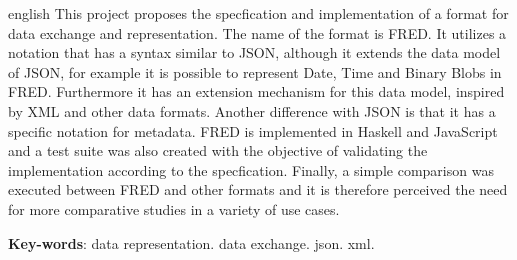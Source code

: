 \begin{resumo}[Abstract]
 \begin{otherlanguage*}{english}
   This project proposes the specfication and implementation of a format
   for data exchange and representation. The name of the format is FRED.
   It utilizes a notation that has a syntax similar to JSON, although
   it extends the data model of JSON, for example it is possible to represent
   Date, Time and Binary Blobs in FRED. Furthermore it has an extension 
   mechanism for this data model, inspired by XML and other data formats.
   Another difference with JSON is that it has a specific notation for
   metadata. FRED is implemented in Haskell and JavaScript and a test suite
   was also created with the objective of validating the implementation
   according to the specfication. Finally, a simple comparison was executed
   between FRED and other formats and it is therefore perceived the need for
   more comparative studies in a variety of use cases.

   \vspace{\onelineskip}
 
   \noindent 
   \textbf{Key-words}: data representation. data exchange. json. xml.
 \end{otherlanguage*}
\end{resumo}
